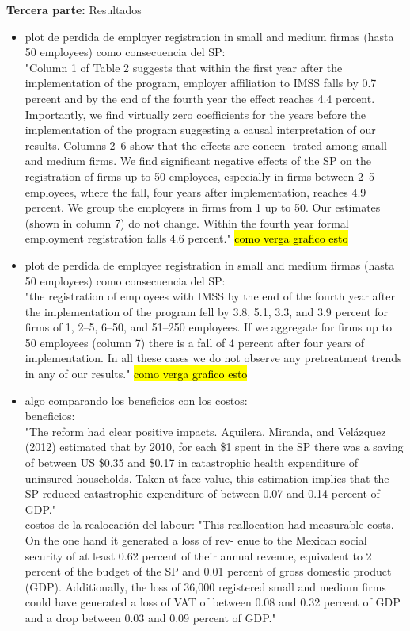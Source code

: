 \textbf{Tercera parte:} Resultados 

\begin{itemize}
  \item plot de perdida de employer registration in small and medium firmas (hasta 50 employees) como consecuencia del SP:\\
  "Column 1 of Table 2 suggests that within the first year after the implementation of the program, employer affiliation to IMSS falls by 0.7 percent and by the end of the fourth year the effect reaches 4.4 percent. Importantly, we find virtually zero coefficients for the years before the implementation of the program suggesting a causal interpretation of our results. Columns 2–6 show that the effects are concen- trated among small and medium firms. We find significant negative effects of the SP on the registration of firms up to 50 employees, especially in firms between 2–5 employees, where the fall, four years after implementation, reaches 4.9 percent. We group the employers in firms from 1 up to 50. Our estimates (shown in column 7) do not change. Within the fourth year formal employment registration falls 4.6 percent."
  \hl{como verga grafico esto}
 \item plot de perdida de employee registration in small and medium firmas (hasta 50 employees) como consecuencia del SP:\\
 "the registration of employees with IMSS by the end of the fourth year after the implementation of the program fell by 3.8, 5.1, 3.3, and 3.9 percent for firms of 1, 2–5, 6–50, and 51–250 employees. If we aggregate for firms up to 50 employees (column 7) there is a fall of 4 percent after four years of implementation. In all these cases we do not observe any pretreatment trends in any of our results."
   \hl{como verga grafico esto}
 \item algo comparando los beneficios con los costos: \\
beneficios:\\ "The reform had clear positive impacts. Aguilera, Miranda, and Velázquez (2012) estimated that by 2010, for each \$1 spent in the SP there was a saving of between US \$0.35 and \$0.17 in catastrophic health expenditure of uninsured households. Taken at face value, this estimation implies that the SP reduced catastrophic expenditure of between 0.07 and 0.14 percent of GDP."\\
costos de la realocación del labour: "This reallocation had measurable costs. On the one hand it generated a loss of rev- enue to the Mexican social security of at least 0.62 percent of their annual revenue, equivalent to 2 percent of the budget of the SP and 0.01 percent of gross domestic product (GDP). Additionally, the loss of 36,000 registered small and medium firms could have generated a loss of VAT of between 0.08 and 0.32 percent of GDP and a drop between 0.03 and 0.09 percent of GDP." \\

\end{itemize}
